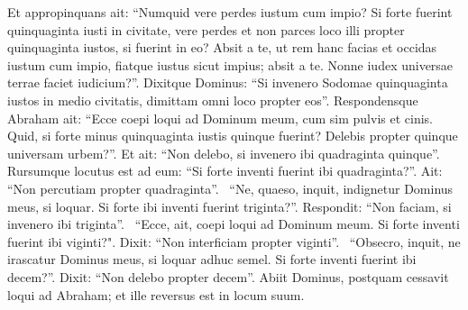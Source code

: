 \begin{biblechapter}
\verse Et appropinquans ait: “Numquid vere perdes iustum cum impio?  
\verse Si forte fuerint quinquaginta iusti in civitate, vere perdes et non parces loco illi propter quinquaginta iustos, si fuerint in eo? 
\verse Absit a te, ut rem hanc facias et occidas iustum cum impio, fiatque iustus sicut impius; absit a te. Nonne iudex universae terrae faciet iudicium?”. 
\verse Dixitque Dominus: “Si invenero Sodomae quinquaginta iustos in medio civitatis, dimittam omni loco propter eos”. 
\verse Respondensque Abraham ait: “Ecce coepi loqui ad Dominum meum, cum sim pulvis et cinis. 
\verse Quid, si forte minus quinquaginta iustis quinque fuerint? Delebis propter quinque universam urbem?”. Et ait: “Non delebo, si invenero ibi quadraginta quinque”. 
\verse Rursumque locutus est ad eum: “Si forte inventi fuerint ibi quadraginta?”. Ait: “Non percutiam propter quadraginta”.  
\verse “Ne, quaeso, inquit, indignetur Dominus meus, si loquar. Si forte ibi inventi fuerint triginta?”. Respondit: “Non faciam, si invenero ibi triginta”.  
\verse “Ecce, ait, coepi loqui ad Dominum meum. Si forte inventi fuerint ibi viginti?". Dixit: “Non interficiam propter viginti”.  
\verse “Obsecro, inquit, ne irascatur Dominus meus, si loquar adhuc semel. Si forte inventi fuerint ibi decem?”. Dixit: “Non delebo propter decem”. 
\verse Abiit Dominus, postquam cessavit loqui ad Abraham; et ille reversus est in locum suum. 
\end{biblechapter}

